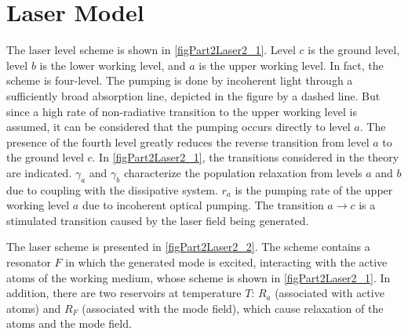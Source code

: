 \section{Laser Model}

The laser level scheme is shown in
\autoref{figPart2Laser2_1}. Level $c$ is the ground level, level $b$ is the lower working level, and $a$ is the upper working level. In fact,
the scheme is four-level. The pumping is done by incoherent light through
a sufficiently broad absorption line, depicted in the figure by
a dashed line. But since a high rate of non-radiative transition to the upper working level is assumed, it can be considered
that the pumping occurs directly to level $a$. The presence of the fourth level
greatly reduces the reverse transition from level $a$ to the ground
level $c$. In \autoref{figPart2Laser2_1}, the transitions considered in the theory are indicated. $\gamma_a$ and $\gamma_b$
characterize the population relaxation from levels $a$ and $b$ due to
coupling with the dissipative system. $r_a$ is the pumping rate of the upper
working level $a$ due to incoherent optical pumping. The transition
$a \rightarrow c$ is a stimulated transition caused by the laser field
being generated.



The laser scheme is presented in \autoref{figPart2Laser2_2}. The scheme
contains a resonator $F$ in which the generated mode is excited,
interacting with the active atoms of the working medium, whose scheme
is shown in \autoref{figPart2Laser2_1}. In addition, there are two
reservoirs at temperature $T$: $R_{a}$ (associated with
active atoms) and $R_{F}$ (associated with the mode field), which cause relaxation
of the atoms and the mode field.



